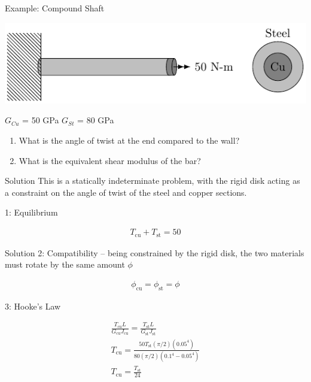\documentclass[10pt, svgnames]{beamer}
\begin{document}
\begin{frame}[label={sec:org84a532b}]{Example: Compound Shaft}
\begin{center}
\begin{center}
\includegraphics[width=.9\linewidth]{./pictures/compound-shaft.pdf}
\end{center}
\end{center}

\(G_{Cu}\) = 50 GPa \(G_{St}\) = 80 GPa

\begin{enumerate}
\item What is the angle of twist at the end compared to the wall?

\item What is the equivalent shear modulus of the bar?
\end{enumerate}
\end{frame}

\begin{frame}[label={sec:org0ecf0bb}]{Solution}
This is a statically indeterminate problem, with the rigid disk
acting as a constraint on the angle of twist of the steel and copper
sections.

1: Equilibrium

\begin{align*}
    T_{\text{cu}} + T_{\text{st}} = 50
\end{align*}
\end{frame}

\begin{frame}[label={sec:orgbdb6ce6}]{Solution}
2: Compatibility -- being constrained by the rigid disk, the two materials must rotate by the same amount \(\phi\)

\begin{align*}
  \phi_{\text{cu}} = \phi_{\text{st}} = \phi
\end{align*}

3: Hooke's Law

\begin{gather*}
    \frac{T_{\text{cu}} L}{G_{\text{cu}}J_{\text{cu}}} = \frac{T_{\text{st}}L}{G_{\text{st}} J_{\text{st}}} \\
    T_{\text{cu}} = \frac{50 T_{\text{st}} (\pi/2)(0.05^{4})}{80 (\pi/2)(0.1^{4} - 0.05^{4})} \\
    T_{\text{cu}} = \frac{T_{\text{st}}}{24}
\end{gather*}
\end{frame}
\end{document}
